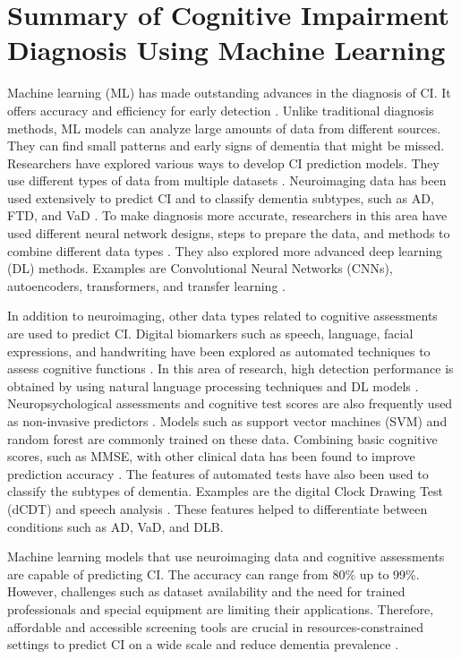 \section{Summary of Cognitive Impairment Diagnosis Using Machine Learning}
Machine learning (\acrshort{ML}) has made outstanding advances in the diagnosis of CI. It offers accuracy and efficiency for early detection \cite{Habehh2021Machine, Li2022Application}. Unlike traditional diagnosis methods, ML models can analyze large amounts of data from different sources. They can find small patterns and early signs of dementia that might be missed. Researchers have explored various ways to develop CI prediction models. They use different types of data from multiple datasets \cite{Javeed2023Machine}. Neuroimaging data has been used extensively to predict CI \cite{Borchert2023Artificial} and to classify dementia subtypes, such as AD, FTD, and VaD \cite{Wang2024Understanding}. To make diagnosis more accurate, researchers in this area have used different neural network designs, steps to prepare the data, and methods to combine different data types \cite{Odusami2024Machine}. They also explored more advanced deep learning (\acrshort{DL}) methods. Examples are Convolutional Neural Networks (CNNs), autoencoders, transformers, and transfer learning \cite{Kaur2024Systematic, Kaur2024Systematic}.

In addition to neuroimaging, other data types related to cognitive assessments are used to predict CI. Digital biomarkers such as speech, language, facial expressions, and handwriting have been explored as automated techniques to assess cognitive functions \cite{Ding2022Digital}. In this area of research, high detection performance is obtained by using natural language processing techniques and DL models \cite{Shi2023Speech}. Neuropsychological assessments and cognitive test scores are also frequently used as non-invasive predictors \cite{Veneziani2024Applications}. Models such as support vector machines (\acrshort{SVM}) and random forest are commonly trained on these data. Combining basic cognitive scores, such as MMSE, with other clinical data has been found to improve prediction accuracy \cite{Basta2023Personalized}. The features of automated tests have also been used to classify the subtypes of dementia. Examples are the digital Clock Drawing Test (\acrshort{dCDT}) \cite{Davoudi2021Classifying} and speech analysis \cite{Yamada2022Speech}. These features helped to differentiate between conditions such as AD, VaD, and DLB.

Machine learning models that use neuroimaging data and cognitive assessments are capable of predicting CI. The accuracy can range from 80\% up to 99\%. However, challenges such as dataset availability and the need for trained professionals and special equipment are limiting their applications. Therefore, affordable and accessible screening tools are crucial in resources-constrained settings to predict CI on a wide scale and reduce dementia prevalence \cite{Magklara2018Current}.

